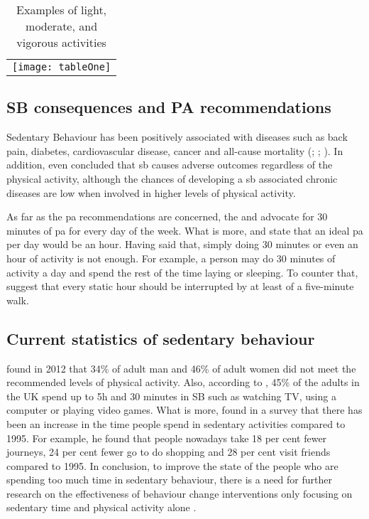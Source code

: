     \begin{table}[h]
        \centering
        \begin{tabular}{c}
            \texttt{[image: tableOne]}
        \end{tabular}
        \caption{Examples of light, moderate, and vigorous activities \citep{harvardthchanschoolofpublichealth2012}}
        \label{tab:activity-intensities}
    \end{table}
    
    \subsection{SB consequences and PA recommendations}
    \label{subsection:sb-consequences-and-pa-recommendations}
    Sedentary Behaviour has been positively associated with diseases such as back pain, diabetes, cardiovascular disease, cancer and all-cause mortality  (\citealp[2895–2905]{wilmot2012}; \citealp[123]{biswas2015}; \citealp[18]{departmentofhealth2010}). In addition, \citet[127]{biswas2015} even concluded that \gls{sb} causes adverse outcomes regardless of the physical activity, although the chances of developing a \gls{sb} associated chronic diseases are low when involved in higher levels of physical activity.
    
    As far as the \gls{pa} recommendations are concerned, the \citet[]{departmentofhealth2011} and \citet[]{townsend2015} advocate for 30 minutes of \gls{pa} for every day of the week. What is more, \citet[]{parkinson2016} and \citet[]{siddique2016} state that an ideal \gls{pa} per day would be an hour. Having said that, simply doing 30 minutes or even an hour of activity is not enough. For example, a person may do 30 minutes of activity a day and spend the rest of the time laying or sleeping. To counter that, \citet[]{swartz2011} suggest that every static hour should be interrupted by at least of a five-minute walk.
    
    \subsection{Current statistics of sedentary behaviour}
    \citet[19]{townsend2015} found in 2012 that 34\% of adult man and 46\% of adult women did not meet the recommended levels of physical activity. Also, according to \citet[81]{townsend2015}, 45\% of the adults in the UK spend up to 5h and 30 minutes in SB such as watching TV, using a computer or playing video games. What is more, \citet{swinford2014} found in a survey that there has been an increase in the time people spend in sedentary activities compared to 1995. For example, he found that people nowadays take 18 per cent fewer journeys, 24 per cent fewer go to do shopping and 28 per cent visit friends compared to 1995. In conclusion, to improve the state of the people who are spending too much time in sedentary behaviour, there is a need for further research on the effectiveness of behaviour change interventions only focusing on sedentary time and physical activity alone \citep[130]{biswas2015}.

